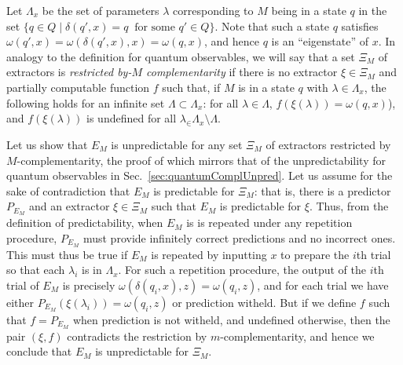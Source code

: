 \documentclass[information,article,submit,moreauthors,pdftex,12pt,a4paper]{mdpi}
\theoremstyle{mdpi}
\newcounter{ex}
\newcounter{re}
\theoremstyle{mdpidefinition}
\begin{document}
Let $\Lambda_x$ be the set of parameters $\lambda$ corresponding to $M$ being in a state $q$ in the set $\{q\in Q\mid \delta(q',x)=q\ \text{ for some $q'\in Q$}\}$.
Note that such a state $q$ satisfies $\omega(q',x)=\omega(\delta(q',x),x)=\omega(q,x)$, and hence $q$ is an ``eigenstate'' of $x$.
In analogy to the definition for quantum observables, we will say that a set $\Xi_M$ of extractors is \emph{restricted by-$M$ complementarity} if there is no extractor $\xi\in\Xi_M$ and partially computable function $f$ such that, if $M$ is in a state $q$ with $\lambda\in\Lambda_x$, the following holds for an infinite set $\Lambda\subset\Lambda_x$: for all $\lambda\in\Lambda$, $f(\xi(\lambda))=\omega(q,x)$), and $f(\xi(\lambda))$ is undefined for all $\lambda_\in\Lambda_x\setminus\Lambda$.

Let us show that $E_M$ is unpredictable for any set $\Xi_M$ of extractors restricted by $M$-complementarity, the proof of which mirrors that of the unpredictability for quantum observables in Sec.~\ref{sec:quantumComplUnpred}.
Let us assume for the sake of contradiction that $E_M$ is predictable for $\Xi_M$: that is, there is a predictor $P_{E_M}$ and an extractor $\xi\in\Xi_M$ such that $E_M$ is predictable for $\xi$.
Thus, from the definition of predictability, when $E_M$ is is repeated under any repetition procedure, $P_{E_M}$ must provide infinitely correct predictions and no incorrect ones.
This must thus be true if $E_M$ is repeated
by inputting $x$ to prepare the $i$th trial %
so that each $\lambda_i$ is in $\Lambda_x$.
For such a repetition procedure, the output of the $i$th trial of $E_M$ is precisely $\omega(\delta(q_i,x),z)=\omega(q_i,z)$, and for each trial we have either $P_{E_M}(\xi(\lambda_i))=\omega(q_i,z)$ or prediction witheld.
But if we define $f$ such that $f=P_{E_M}$ when prediction is not witheld, and undefined otherwise, then the pair $(\xi,f)$ contradicts the restriction by $m$-complementarity, and hence we conclude that $E_M$ is unpredictable for $\Xi_M$.
\end{document}
